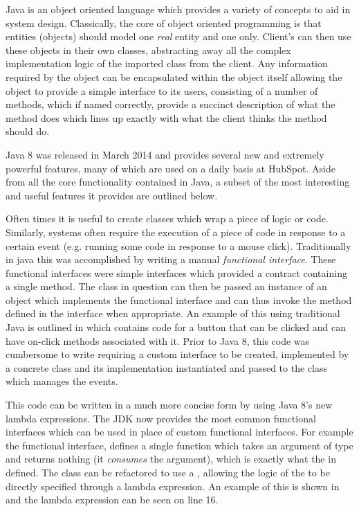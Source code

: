 Java is an object oriented language which provides a variety of concepts to aid in system design. Classically, the core of object oriented programming is that entities (objects) should model one \textit{real} entity and one only. Client's can then use these objects in their own classes, abstracting away all the complex implementation logic of the imported class from the client. Any information required by the object can be encapsulated within the object itself allowing the object to provide a simple interface to its users, consisting of a number of methods, which if named correctly, provide a succinct description of what the method does which lines up exactly with what the client thinks the method should do.

Java 8 was released in March 2014 and provides several new and extremely powerful features, many of which are used on a daily basis at HubSpot. Aside from all the core functionality contained in Java, a subset of the most interesting and useful features it provides are outlined below.

Often times it is useful to create classes which wrap a piece of logic or code. Similarly, systems often require the execution of a piece of code in response to a certain event (e.g. running some code in response to a mouse click). Traditionally in java this was accomplished by writing a manual \textit{functional interface}. These functional interfaces were simple interfaces which provided a contract containing a single method. The class in question can then be passed an instance of an object which implements the functional interface and can thus invoke the method defined in the interface when appropriate. An example of this using traditional Java is outlined in  which contains code for a button that can be clicked and can have on-click methods associated with it. Prior to Java 8, this code was cumbersome to write requiring a custom interface to be created, implemented by a concrete class and its implementation instantiated and passed to the class which manages the events. 



This code can be written in a much more concise form by using Java 8's new lambda expressions. The JDK now provides the most common functional interfaces which can be used in place of custom functional interfaces. For example the  functional interface, defines a single  function which takes an argument of type  and returns nothing (it \textit{consumes} the argument), which is exactly what the  in  defined. The  class can be refactored to use a , allowing the logic of the  to be directly specified through a lambda expression. An example of this is shown in  and the lambda expression can be seen on line 16.
\vfill

